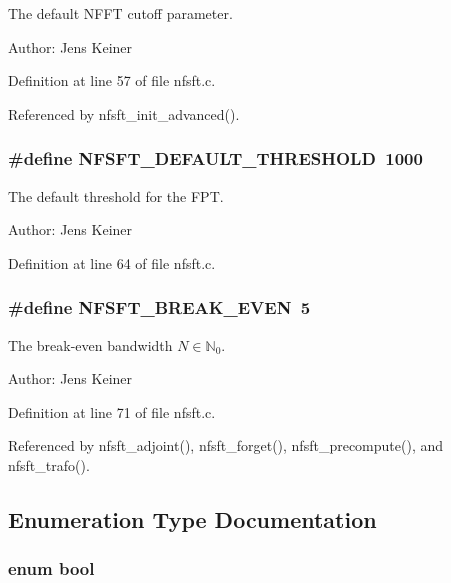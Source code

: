 The default NFFT cutoff parameter. 

\begin{Desc}
\item[Author:]Jens Keiner \end{Desc}


Definition at line 57 of file nfsft.c.

Referenced by nfsft\_\-init\_\-advanced().\hypertarget{group__nfsft_gb7d25b80464387893b3c773f92e5c4f3}{
\subsubsection{\setlength{\rightskip}{0pt plus 5cm}\#define NFSFT\_\-DEFAULT\_\-THRESHOLD~1000}}
\label{group__nfsft_gb7d25b80464387893b3c773f92e5c4f3}


The default threshold for the FPT. 

\begin{Desc}
\item[Author:]Jens Keiner \end{Desc}


Definition at line 64 of file nfsft.c.\hypertarget{group__nfsft_g54b840898df97bcd14af4cb004650ed3}{
\subsubsection{\setlength{\rightskip}{0pt plus 5cm}\#define NFSFT\_\-BREAK\_\-EVEN~5}}
\label{group__nfsft_g54b840898df97bcd14af4cb004650ed3}


The break-even bandwidth $N \in \mathbb{N}_0$. 

\begin{Desc}
\item[Author:]Jens Keiner \end{Desc}


Definition at line 71 of file nfsft.c.

Referenced by nfsft\_\-adjoint(), nfsft\_\-forget(), nfsft\_\-precompute(), and nfsft\_\-trafo().

\subsection{Enumeration Type Documentation}
\hypertarget{group__nfsft_gf6a258d8f3ee5206d682d799316314b1}{
\subsubsection{\setlength{\rightskip}{0pt plus 5cm}enum {\bf bool}}}
\label{group__nfsft_gf6a258d8f3ee5206d682d799316314b1}


